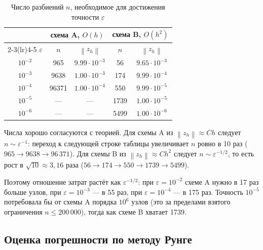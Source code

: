 \documentclass[12pt,a4paper]{article}
\newcommand{\norm}[1]{\left\|#1\right\|}
\begin{document}
\begin{table}[htbp]
\caption{Число разбиений $n$, необходимое для достижения точности
$\varepsilon$}
\label{tab:eps}
\centering
\begin{tabular}{c c c c c}
\toprule
& \multicolumn{2}{c}{схема A, $O(h)$} & \multicolumn{2}{c}{схема B, $O(h^2)$}\\
\cmidrule(lr){2-3}\cmidrule(lr){4-5}
$\varepsilon$ & $n$ & $\norm{z_h}$ & $n$ & $\norm{z_h}$\\
\midrule
$10^{-2}$ & 965 & $9.99\cdot10^{-3}$ & 56 & $9.65\cdot10^{-3}$ \\
$10^{-3}$ & 9638 & $1.00\cdot10^{-3}$ & 174 & $9.99\cdot10^{-4}$ \\
$10^{-4}$ & 96371 & $1.00\cdot10^{-4}$ & 550 & $9.99\cdot10^{-5}$ \\
$10^{-5}$ & --- & --- & 1739 & $1.00\cdot10^{-5}$ \\
$10^{-6}$ & --- & --- & 5499 & $1.00\cdot10^{-6}$ \\
\bottomrule
\end{tabular}
\end{table}

Числа хорошо согласуются с теорией. Для схемы A из $\norm{z_h}\approx Ch$
следует $n\sim\varepsilon^{-1}$: переход к следующей строке таблицы
увеличивает $n$ ровно в 10 раз ($965\to9638\to96\,371$). Для схемы B из
$\norm{z_h}\approx Ch^2$ следует $n\sim\varepsilon^{-1/2}$, то есть рост
в $\sqrt{10}\approx3{,}16$ раза ($56\to174\to550\to1739\to5499$).

Поэтому отношение затрат растёт как $\varepsilon^{-1/2}$: при
$\varepsilon=10^{-2}$ схеме A нужно в 17 раз больше узлов, при
$\varepsilon=10^{-3}$ --- в 55 раз, при $\varepsilon=10^{-4}$ --- в 175
раз. Точность $10^{-5}$ потребовала бы от схемы A порядка $10^{6}$ узлов
(это за пределами взятого ограничения $n\le200\,000$), тогда как схеме B
хватает 1739.

\subsection{Оценка погрешности по методу Рунге}
\label{sec:runge}
\end{document}
